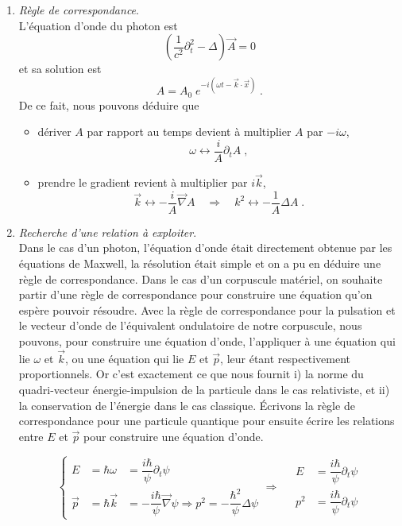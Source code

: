 \documentclass[12pt, a4paper]{book}
\begin{document}
\begin{enumerate}[label =  (\alph*)]
\item \textit{Règle de correspondance}. \\
L'équation d'onde du photon est
$$\left(\dfrac{1}{c^2} \partial_t ^2 - \Delta \right) \vec A = 0$$
et sa solution est $$
A = A_0 \; e^{-i(\omega t - \vec k \cdot \vec x)} \; .$$
De ce fait, nous pouvons déduire que 
\begin{itemize}
\item dériver $A$ par rapport au temps devient à multiplier $A$ par $-i\omega$,
$$\boxed{\omega \longleftrightarrow \dfrac{i}{A} \partial_t A} \; , $$
\item prendre le gradient revient à multiplier par $i\vec k$, 
$$\vec k \longleftrightarrow -\dfrac{i}{A} \vec \nabla A \quad \Rightarrow \quad \boxed{k^2 \longleftrightarrow -\dfrac{1}{A} \Delta A} \; .$$
\end{itemize}

\item \textit{Recherche d'une relation à exploiter}. \\
Dans le cas d'un photon, l'équation d'onde était directement obtenue par les équations de Maxwell, la résolution était simple et on a pu en déduire une règle de correspondance. Dans le cas d'un corpuscule matériel, on souhaite partir d'une règle de correspondance pour construire une équation qu'on espère pouvoir résoudre. Avec la règle de correspondance pour la pulsation et le vecteur d'onde de l'équivalent ondulatoire de notre corpuscule, nous pouvons, pour construire une équation d'onde, l'appliquer à une équation qui lie $\omega$ et $\vec k$, ou une équation qui lie $E$ et $\vec p$, leur étant respectivement proportionnels. Or c'est exactement ce que nous fournit i) la norme du quadri-vecteur énergie-impulsion de la particule dans le cas relativiste, et ii) la conservation de l'énergie dans le cas classique. Écrivons la règle de correspondance pour une particule quantique pour ensuite écrire les relations entre $E$ et $\vec p$ pour construire une équation d'onde.

\begin{equation} \label{eq:ch2-correspondance}
\left\{ \begin{array}{lll}
E &= \hbar \omega &= \dfrac{i\hbar}{\psi} \partial_t \psi \\
\vec p &= \hbar \vec k &= -\dfrac{i\hbar}{\psi} \vec \nabla \psi \Rightarrow p^2 = -\dfrac{\hbar ^2}{\psi} \Delta \psi
\end{array} \right. \Longrightarrow \quad \boxed{\begin{array}{ll}
E &=\dfrac{i\hbar}{\psi} \partial_t \psi \\
p^2 &=  \dfrac{i\hbar}{\psi} \partial_t \psi
\end{array}}
\end{equation}


\end{enumerate}
\end{document}
